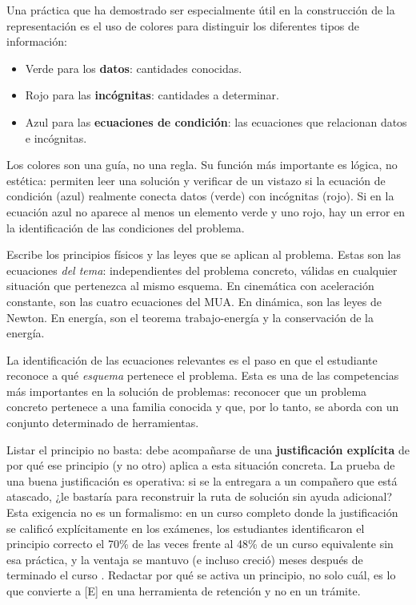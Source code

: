 \documentclass[11pt]{book}
\newcommand{\dato}[1]{\textcolor{colDatos}{#1}}
\newcommand{\incog}[1]{\textcolor{colIncog}{#1}}
\newcommand{\cond}[1]{\textcolor{colCond}{#1}}
\begin{document}
\begin{enumerate}
Una práctica que ha demostrado ser especialmente útil en la construcción de la representación es el uso de colores para distinguir los diferentes tipos de información:

\begin{itemize}
    \item \dato{Verde} para los {\bf datos}: cantidades conocidas.
    \item \incog{Rojo} para las {\bf incógnitas}: cantidades a determinar.
    \item \cond{Azul} para las {\bf ecuaciones de condición}: las ecuaciones que relacionan datos e incógnitas.
\end{itemize}

Los colores son una guía, no una regla. Su función más importante es lógica, no estética: permiten leer una solución y verificar de un vistazo si la ecuación de condición (azul) realmente conecta datos (verde) con incógnitas (rojo). Si en la ecuación azul no aparece al menos un elemento verde y uno rojo, hay un error en la identificación de las condiciones del problema.

\medskip
{}
\medskip

Escribe los principios físicos y las leyes que se aplican al problema. Estas son las ecuaciones {\it del tema}: independientes del problema concreto, válidas en cualquier situación que pertenezca al mismo esquema. En cinemática con aceleración constante, son las cuatro ecuaciones del MUA. En dinámica, son las leyes de Newton. En energía, son el teorema trabajo-energía y la conservación de la energía.

La identificación de las ecuaciones relevantes es el paso en que el estudiante reconoce a qué {\it esquema} pertenece el problema. Esta es una de las competencias más importantes en la solución de problemas: reconocer que un problema concreto pertenece a una familia conocida y que, por lo tanto, se aborda con un conjunto determinado de herramientas.

Listar el principio no basta: debe acompañarse de una {\bf justificación explícita} de por qué ese principio (y no otro) aplica a esta situación concreta. La prueba de una buena justificación es operativa: si se la entregara a un compañero que está atascado, ¿le bastaría para reconstruir la ruta de solución sin ayuda adicional? Esta exigencia no es un formalismo: en un curso completo donde la justificación se calificó explícitamente en los exámenes, los estudiantes identificaron el principio correcto el 70\% de las veces frente al 48\% de un curso equivalente sin esa práctica, y la ventaja se mantuvo (e incluso creció) meses después de terminado el curso \cite{Leonard1996,Mestre2020}. Redactar por qué se activa un principio, no solo cuál, es lo que convierte a [E] en una herramienta de retención y no en un trámite.


\end{enumerate}
\end{document}

